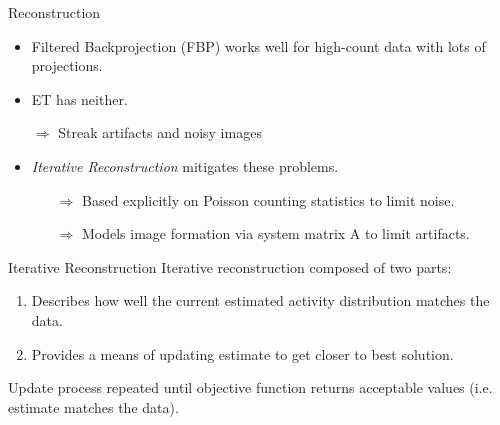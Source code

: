 

\begin{frame}[c]{Reconstruction}

    \begin{itemize}
        \setlength\itemsep{0.3cm}
        \item Filtered Backprojection (FBP) works well for high-count data with lots of projections.
        \item ET has neither.

              $\Rightarrow$ Streak artifacts and noisy images
        \item \emph{Iterative Reconstruction} mitigates these problems.
              \begin{itemize}
                  \item[$\Rightarrow$] Based explicitly on Poisson counting statistics to limit noise.
                  \item[$\Rightarrow$] Models image formation via system matrix A to limit artifacts.
              \end{itemize}
    \end{itemize}
\end{frame}


\begin{frame}[c]{Iterative Reconstruction}
    Iterative reconstruction composed of two parts:
    \vspace{0.3cm}

    \begin{enumerate}
        \item \textbf{\color{faublue}{Objective Function}}

              Describes how well the current estimated activity distribution matches the data.

        \item {\textbf{\color{faublue}{Optimizer}}}

              Provides a means of updating estimate to get closer to best solution.
    \end{enumerate}
    \vspace{0.3cm}

    Update process repeated until objective function returns acceptable values (i.e. estimate matches the data).
\end{frame}

